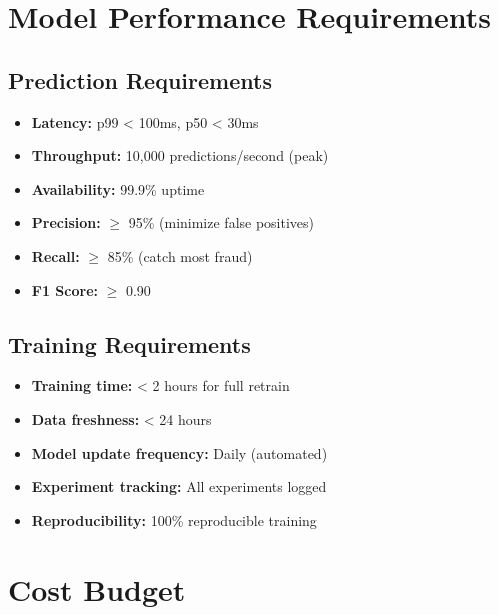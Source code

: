 \section{Model Performance Requirements}

\subsection{Prediction Requirements}

\begin{itemize}
    \item \textbf{Latency:} p99 < 100ms, p50 < 30ms
    \item \textbf{Throughput:} 10,000 predictions/second (peak)
    \item \textbf{Availability:} 99.9\% uptime
    \item \textbf{Precision:} $\geq$ 95\% (minimize false positives)
    \item \textbf{Recall:} $\geq$ 85\% (catch most fraud)
    \item \textbf{F1 Score:} $\geq$ 0.90
\end{itemize}

\subsection{Training Requirements}

\begin{itemize}
    \item \textbf{Training time:} < 2 hours for full retrain
    \item \textbf{Data freshness:} < 24 hours
    \item \textbf{Model update frequency:} Daily (automated)
    \item \textbf{Experiment tracking:} All experiments logged
    \item \textbf{Reproducibility:} 100\% reproducible training
\end{itemize}

\section{Cost Budget}

